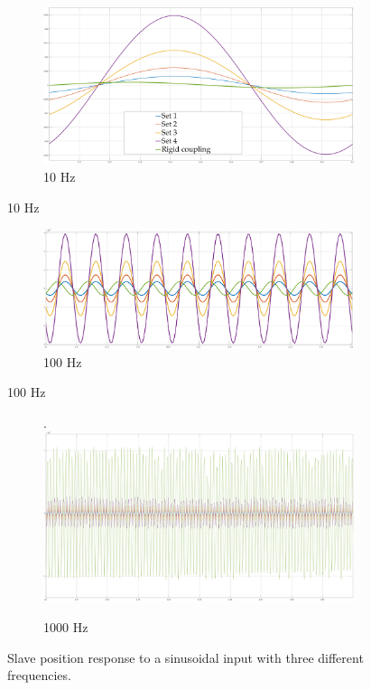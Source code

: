 \begin{figure}[H]
	\begin{subfigure}[h!]{1\linewidth}
		\centering
		\includegraphics[width=\textwidth, height=0.40\textwidth]{Images/vibr10Htz}
		\caption{10 Hz}
		\label{fig:10Htz}
	\end{subfigure}
\end{figure}
\begin{figure}\ContinuedFloat
	\begin{subfigure}[h!]{1\linewidth}
		\centering
		\includegraphics[width=\textwidth, height=0.45\textwidth]{Images/vibr100Htz}
		\caption{100 Hz}
		\label{fig:100Htz}
	\end{subfigure}
\end{figure}
\begin{figure}\ContinuedFloat
	\begin{subfigure}[h!]{1\linewidth}
		\centering.
		\includegraphics[width=\textwidth, height=0.45\textwidth]{Images/vibr1000Htz}
		\caption{1000 Hz}
		\label{fig:1000Htz}
	\end{subfigure}
\caption{Slave position response to a sinusoidal input with three different frequencies.}
\label{positionResponceFrequencies}
\end{figure}

